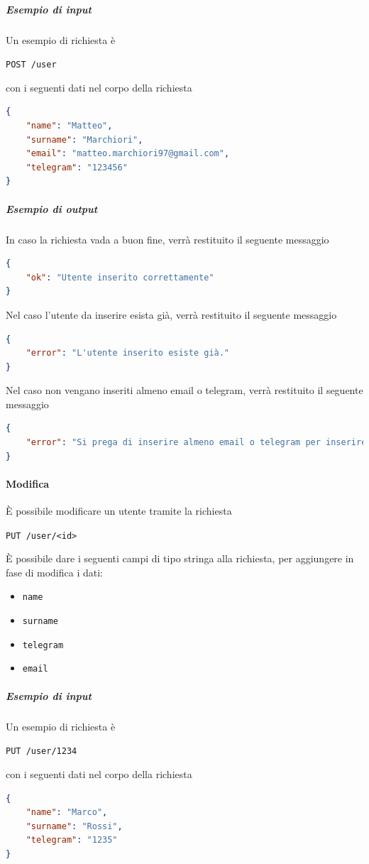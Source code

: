    \subparagraph{Esempio di input}
    Un esempio di richiesta è
        \begin{center}
            \texttt{POST  /user}
        \end{center}
    con i seguenti dati nel corpo della richiesta
    \begin{lstlisting}[language = json]
{
    "name": "Matteo",
    "surname": "Marchiori",
    "email": "matteo.marchiori97@gmail.com",
    "telegram": "123456"
}
    \end{lstlisting}


    \subparagraph{Esempio di output}
    In caso la richiesta vada a buon fine, verrà restituito il seguente messaggio
    \begin{lstlisting}[language = json]
{
    "ok": "Utente inserito correttamente"
}
    \end{lstlisting}

    Nel caso l'utente da inserire esista già, verrà restituito il seguente messaggio
    \begin{lstlisting}[language = json]
{
    "error": "L'utente inserito esiste già."
}
    \end{lstlisting}

    Nel caso non vengano inseriti almeno email o telegram, verrà restituito il seguente messaggio
    \begin{lstlisting}[language = json]
{
    "error": "Si prega di inserire almeno email o telegram per inserire l'utente."
}
    \end{lstlisting}

\paragraph{Modifica}

È possibile modificare un utente tramite la richiesta
\begin{center}
    \texttt{PUT /user/<id>}
\end{center}

È possibile dare i seguenti campi di tipo stringa alla richiesta, per aggiungere in fase di modifica i dati:
\begin{itemize}[noitemsep]
    \item \texttt{name}
    \item \texttt{surname}
    \item \texttt{telegram}
    \item \texttt{email}
\end{itemize}

    \subparagraph{Esempio di input}
    Un esempio di richiesta è
    \begin{center}
	    \texttt{PUT /user/1234}
    \end{center}
    con i seguenti dati nel corpo della richiesta
	\begin{lstlisting}[language = json]
{
    "name": "Marco",
    "surname": "Rossi",
    "telegram": "1235"
}
    \end{lstlisting}


